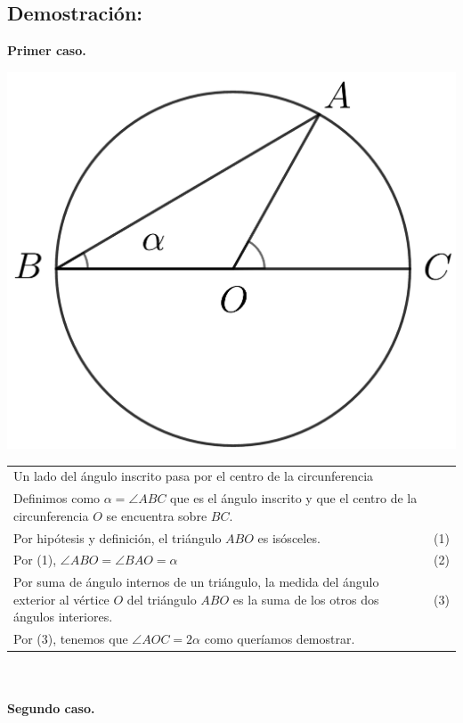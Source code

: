 \documentclass[12pt,a4paper]{article}
\begin{document}
\subsection*{Demostración:}
\textbf{Primer caso.}
\begin{center}
\includegraphics[scale=0.6]{Imagenes/circulo.png} 
\end{center}
\begin{tabular}{p{15.9 cm} p{1cm}}
Un lado del ángulo inscrito pasa por el centro de la circunferencia 
\\Definimos como $\alpha =\angle ABC$ que es el ángulo inscrito y que el centro de la circunferencia $O$ se encuentra sobre $BC$. 
\\Por hipótesis y definición, el triángulo $ABO$ es isósceles. &(1)
\\Por (1), $\angle ABO = \angle BAO = \alpha$ &(2)
\\Por suma de ángulo internos de un triángulo, la medida del ángulo exterior al vértice $O$ del triángulo $ABO$ es la suma de los otros dos ángulos interiores. &\medskip(3)
\\Por (3), tenemos que $\angle AOC =2 \alpha$ como queríamos demostrar.
\end{tabular}\\\\
\textbf{Segundo caso.}
\end{document}
